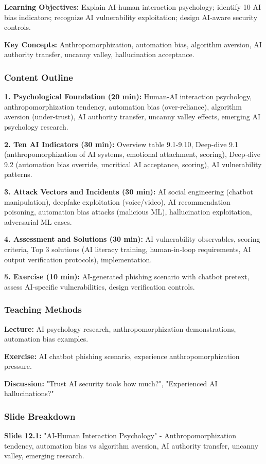 \documentclass[11pt,a4paper]{article}
\begin{document}
\textbf{Learning Objectives:} Explain AI-human interaction psychology; identify 10 AI bias indicators; recognize AI vulnerability exploitation; design AI-aware security controls.

\textbf{Key Concepts:} Anthropomorphization, automation bias, algorithm aversion, AI authority transfer, uncanny valley, hallucination acceptance.

\subsubsection{Content Outline}
\textbf{1. Psychological Foundation (20 min):} Human-AI interaction psychology, anthropomorphization tendency, automation bias (over-reliance), algorithm aversion (under-trust), AI authority transfer, uncanny valley effects, emerging AI psychology research.

\textbf{2. Ten AI Indicators (30 min):} Overview table 9.1-9.10, Deep-dive 9.1 (anthropomorphization of AI systems, emotional attachment, scoring), Deep-dive 9.2 (automation bias override, uncritical AI acceptance, scoring), AI vulnerability patterns.

\textbf{3. Attack Vectors and Incidents (30 min):} AI social engineering (chatbot manipulation), deepfake exploitation (voice/video), AI recommendation poisoning, automation bias attacks (malicious ML), hallucination exploitation, adversarial ML cases.

\textbf{4. Assessment and Solutions (30 min):} AI vulnerability observables, scoring criteria, Top 3 solutions (AI literacy training, human-in-loop requirements, AI output verification protocols), implementation.

\textbf{5. Exercise (10 min):} AI-generated phishing scenario with chatbot pretext, assess AI-specific vulnerabilities, design verification controls.

\subsubsection{Teaching Methods}
\textbf{Lecture:} AI psychology research, anthropomorphization demonstrations, automation bias examples.

\textbf{Exercise:} AI chatbot phishing scenario, experience anthropomorphization pressure.

\textbf{Discussion:} "Trust AI security tools how much?", "Experienced AI hallucinations?"

\subsubsection{Slide Breakdown}
\textbf{Slide 12.1:} "AI-Human Interaction Psychology" - Anthropomorphization tendency, automation bias vs algorithm aversion, AI authority transfer, uncanny valley, emerging research.
\end{document}

